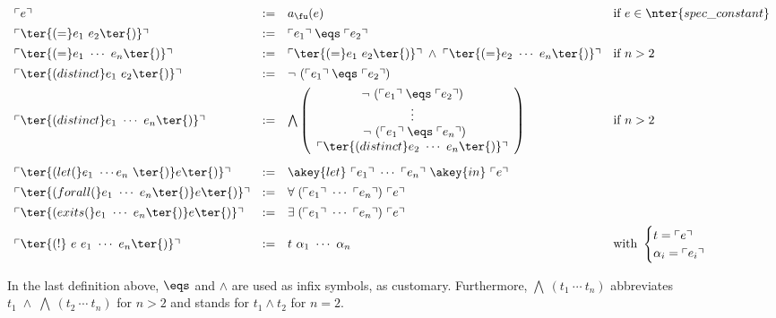 \(
\begin{array}{llll}
 \tr{e} & := & a_{\fu}(e)
 & \text{if } e \in \nter{spec\_constant}
 \\[1ex]
 \tr{\ter{(= } e_1\ e_2 \ter{)}} & := & 
 \tr{e_1}\; \eqs\; \tr{e_2}
 \\[1ex]
 \tr{\ter{(= } e_1\ \cdots\ e_n \ter{)}} & := & 
 \tr{\ter{(= } e_1\ e_2 \ter{)}} \;\land\;
 \tr{\ter{(= } e_2\ \cdots\ e_n \ter{)}}
 & \text{if } n > 2
 \\[1ex]
 \tr{\ter{(distinct } e_1\ e_2 \ter{)}} & := & 
 \lnot\ (\tr{e_1}\; \eqs\ \tr{e_2})
 \\[1ex]
 \tr{\ter{(distinct } e_1\ \cdots\ e_n \ter{)}} & := & 
 \bigwedge \left(\begin{array}{c}
             \lnot\ (\tr{e_1}\; \eqs\; \tr{e_2}) \\
             \vdots \\
             \ \lnot\ (\tr{e_1}\; \eqs\; \tr{e_n}) \\
             \tr{\ter{(distinct } e_2\ \cdots\ e_n \ter{)}}
             \end{array}
             \right)
 & \text{if } n > 2
 \\[7ex]
 \tr{\ter{(let (} e_1\ \cdots e_n\ \ter{) } e \ter{)}} & := & 
 \akey{let}\ \tr{e_1}\ \cdots\ \tr{e_n}\ \akey{in}\ \tr{e}
 \\[1ex]
 \tr{\ter{(forall (} e_1\ \cdots\ e_n \ter{) } e \ter{)}} & := & 
 \forall\; (\tr{e_1}\ \cdots\ \tr{e_n})\ \tr{e}
 \\[1ex]
 \tr{\ter{(exits (} e_1\ \cdots\ e_n \ter{) } e \ter{)}} & := & 
 \exists\; (\tr{e_1}\ \cdots\ \tr{e_n})\ \tr{e}
 \\[1ex]
 \tr{\ter{(!}\ e\ e_1\ \cdots\ e_n \ter{)}} & := & 
 t\ \alpha_1\ \cdots\ \alpha_n
 & \text{with } \begin{cases} t = \tr{e}\\ \alpha_i = \tr{e_i}\end{cases}
\end{array}
\)
\bigskip

\noindent 
In the last definition above,
$\eqs$ and $\land$ are used as infix symbols,
as customary.
Furthermore,
$\bigwedge\: (t_1 \ \cdots \ t_n)$ abbreviates
$t_1\; \land \; \bigwedge\: (t_2\ \cdots \ t_n)$
for $n>2$ and stands for $t_1 \land t_2$ for $n=2$. 
\bigskip


\noindent {} \\

